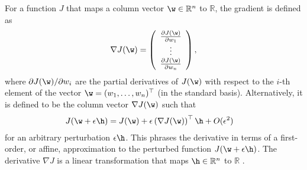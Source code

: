 
\label{ex:grad-vector}
For a function $J$ that maps a column vector $\w \in \mathbb{R}^n$ to $\mathbb{R}$, the gradient is defined as
\begin{equation}
  \nabla J(\w) = \left(
    \begin{array}{c}
      \frac{\partial J(\w)}{\partial w_1} \\ %
      \vdots \\
      \frac{\partial J(\w)}{\partial w_n}
    \end{array} \right),
\end{equation}
where $\partial J(\w)/\partial w_i$ are the partial derivatives of $J(\w)$ with
respect to the $i$-th element of the vector $\w = (w_1, \ldots, w_n)^\top$ (in
the standard basis). Alternatively, it is defined to be the column vector $\nabla J(\w)$ such that
\begin{align}
  J(\w+\epsilon \h) &=  J(\w) + \epsilon \left( \nabla J(\w)\right)^\top \h+O(\epsilon^2) \label{eq:grad-vector}
\end{align}
for an arbitrary perturbation $\epsilon \h$. This phrases the derivative in
terms of a first-order, or affine, approximation to the perturbed function
$J(\w+\epsilon \h)$. The derivative $\nabla J$ is a linear transformation that
maps $\h \in \mathbb{R}^n$ to $\mathbb{R}$ \citep[see e.g.][Chapter 9, for a
formal treatment of derivatives]{Rudin1976}.

